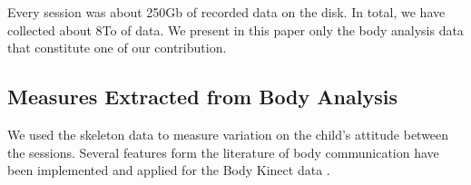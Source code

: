 \documentclass[a4paper,twocolumn]{svjour3}
\begin{document}
%
%

 
Every session was about 250Gb of recorded data on the disk. 
In total, we have collected about 8To of data. 
We present in this paper only the body analysis data that constitute one of our contribution.


\subsection{Measures Extracted from Body Analysis}
We used the skeleton data to measure variation on the child's attitude between the sessions.
Several features form the literature of body communication have been implemented and applied for the Body Kinect data \cite{larboulette2015review}.
\end{document}
